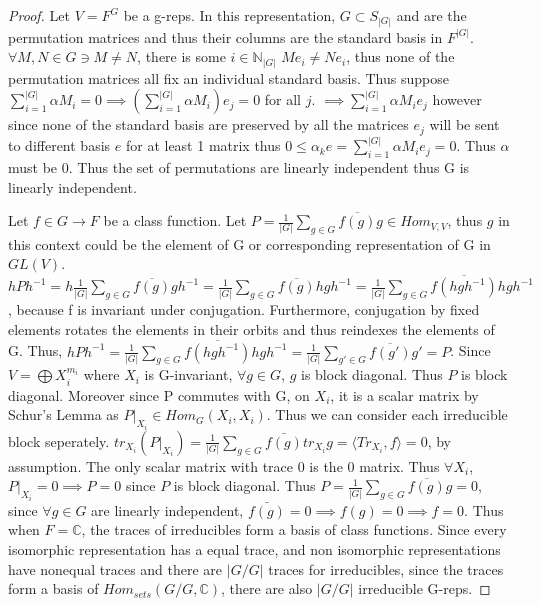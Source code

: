 \documentclass{article}
\newcommand{\C}{\mathbb{C}}
\newcommand{\N}{\mathbb{N}}
\newcommand{\angles}[1]{\langle #1 \rangle}
\begin{document}
\begin{proof}
    Let $V = F^G$ be a g-reps. In this representation, $G \subset S_{|G|}$ and are the permutation matrices and thus their columns are the standard basis in $F^{|G|}$. $\forall M, N \in G \ni M \neq N$, there is some $i \in \N_{|G|}$ $Me_i \neq Ne_i$, thus none of the permutation matrices all fix an individual standard basis. Thus suppose $\sum_{i = 1}^{|G|} \alpha M_i = 0 \implies (\sum_{i = 1}^{|G|} \alpha M_i)e_j = 0$ for all $j$.  $\implies\sum_{i = 1}^{|G|} \alpha M_i e_j$ however since none of the standard basis are preserved by all the matrices $e_j$ will be sent to different basis $e$ for at least 1 matrix thus $0 \leq \alpha_k e = \sum_{i = 1}^{|G|} \alpha M_i e_j = 0$. Thus $\alpha$ must be 0. Thus the set of permutations are linearly independent thus G is linearly independent.
    
    Let $f \in G \to F$ be a class function. Let $P = \frac{1}{|G|} \sum_{g \in G} \overline{f(g)} g \in Hom_{V, V}$, thus $g$ in this context could be the element of G or corresponding representation of G in $GL(V)$. $hPh^{-1} = h\frac{1}{|G|} \sum_{g \in G} \overline{f(g)} gh^{-1} = \frac{1}{|G|} \sum_{g \in G} \overline{f(g)} hgh^{-1} = \frac{1}{|G|} \sum_{g \in G} \overline{f(hgh^{-1})} hgh^{-1}$, because f is invariant under conjugation. Furthermore, conjugation by fixed elements rotates the elements in their orbits and thus reindexes the elements of G. Thus, $hPh^{-1} = \frac{1}{|G|} \sum_{g \in G} \overline{f(hgh^{-1})} hgh^{-1} = \frac{1}{|G|} \sum_{g' \in G} \overline{f(g')} g' = P$. Since $V = \bigoplus X_i^{m_i}$ where $X_i$ is G-invariant, $\forall g \in G$, $g$ is block diagonal. Thus $P$ is block diagonal. Moreover since P commutes with G, on $X_i$, it is a scalar matrix by Schur's Lemma as $P|_{X_i} \in Hom_{G}(X_i, X_i)$. Thus we can consider each irreducible block seperately. $tr_{X_i}(P|_{X_i}) = \frac{1}{|G|} \sum_{g \in G} \bar{f(g)} tr_{X_i}{g} = \angles{Tr_{X_i}, f} = 0 $, by assumption. The only scalar matrix with trace 0 is the 0 matrix. Thus $\forall X_i$, $P|_{X_i} = 0 \implies P = 0$ since $P$ is block diagonal. Thus $P = \frac{1}{|G|} \sum_{g \in G} \overline{f(g)} g = 0$, since $\forall g \in G$ are linearly independent, $\bar{f(g)} = 0 \implies f(g) = 0 \implies f = 0$. Thus when $F = \C$, the traces of irreducibles form a basis of class functions. Since every isomorphic representation has a equal trace, and non isomorphic representations have nonequal traces and there are $|G / G|$ traces for irreducibles, since the traces form a basis of $Hom_{sets}(G / G, \C)$, there are also $| G / G |$ irreducible G-reps.           
\end{proof}
\end{document}

